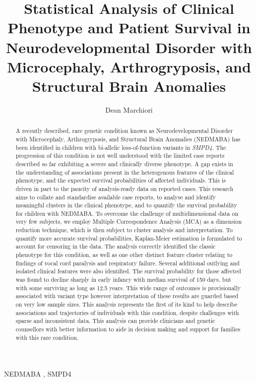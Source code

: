 \documentclass[
  authoryear,
  preprint,
  3p]{elsarticle}
\begin{document}
\begin{frontmatter}
\title{Statistical Analysis of Clinical Phenotype and Patient Survival
in Neurodevelopmental Disorder with Microcephaly, Arthrogryposis, and
Structural Brain Anomalies}
\author[]{Dean Marchiori%
%
}



        
\begin{abstract}
A recently described, rare genetic condition known as Neurodevelopmental
Disorder with Microcephaly, Arthrogryposis, and Structural Brain
Anomalies (NEDMABA) has been identified in children with bi-allelic
loss-of-function variants in \emph{SMPD4}. The progression of this
condition is not well understood with the limited case reports described
so far exhibiting a severe and clinically diverse phenotype. A gap
exists in the understanding of associations present in the heterogenous
features of the clinical phenotype, and the expected survival
probabilities of affected individuals. This is driven in part to the
paucity of analysis-ready data on reported cases. This research aims to
collate and standardise available case reports, to analyse and identify
meaningful clusters in the clinical phenotype, and to quantify the
survival probability for children with NEDMABA. To overcome the
challenge of multidimensional data on very few subjects, we employ
Multiple Correspondence Analysis (MCA) as a dimension reduction
technique, which is then subject to cluster analysis and interpretation.
To quantify more accurate survival probabilities, Kaplan-Meier
estimation is formulated to account for censoring in the data. The
analysis correctly identified the classic phenotype for this condition,
as well as one other distinct feature cluster relating to findings of
vocal cord paralysis and respiratory failure. Several additional
outlying and isolated clinical features were also identified. The
survival probability for those affected was found to decline sharply in
early infancy with median survival of 150 days, but with some surviving
as long as 12.5 years. This wide range of outcomes is provisionally
associated with variant type however interpretation of these results are
guarded based on very low sample sizes. This analysis represents the
first of its kind to help describe associations and trajectories of
individuals with this condition, despite challenges with sparse and
inconsistent data. This analysis can provide clinicians and genetic
counsellors with better information to aide in decision making and
support for families with this rare condition.
\end{abstract}





\begin{keyword}
    NEDMABA \sep 
    SMPD4
\end{keyword}
\end{frontmatter}\ifdefined\Shaded\renewenvironment{Shaded}{\begin{tcolorbox}[enhanced, breakable, sharp corners, interior hidden, borderline west={3pt}{0pt}{shadecolor}, boxrule=0pt, frame hidden]}{\end{tcolorbox}}\fi
\end{document}
